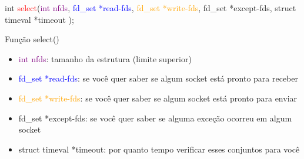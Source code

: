 \documentclass[10pt, xcolor=x11names]{beamer}
\begin{document}

\begin{frame}

int \textcolor{red}{select}(\textcolor{purple}{int nfds}, \textcolor{blue}{fd\_set *read-fds}, \textcolor{orange}{fd\_set *write-fds}, \textcolor[rgb]{.01,.3,.0}{fd\_set *except-fds}, \textcolor[rgb]{.74,.01,.61}{struct timeval *timeout} );
	\begin{block}{Função select()}
	
		\begin{itemize}[<+->]
			\item \textcolor{purple}{int nfds}: tamanho da estrutura (limite superior)
			\item \textcolor{blue}{fd\_set *read-fds}: se você quer saber se algum socket está pronto para receber
			\item \textcolor{orange}{fd\_set *write-fds}: se você quer saber se algum socket está pronto para enviar
			\item \textcolor[rgb]{.01,.3,.0}{fd\_set *except-fds}: se você quer saber se alguma exceção ocorreu em algum socket
			\item \textcolor[rgb]{.74,.01,.61}{struct timeval *timeout}: por quanto tempo verificar esses conjuntos para você
		\end{itemize}

	\end{block}
	
\end{frame}
\end{document}
